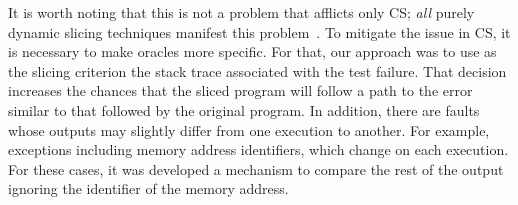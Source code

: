 \documentclass{article}
\begin{document}
It is worth noting that this is not a problem that afflicts only CS;
\emph{all} purely dynamic slicing techniques manifest this
problem~\cite{Lin:2018:BDE:3238147.3238163}. To mitigate the issue in
CS, it is necessary to make oracles more specific. For that, our
approach was to use as the slicing criterion the stack trace
associated with the test failure. That decision increases the chances
that the sliced program will follow a path to the error similar to
that followed by the original program.
In addition, there are faults whose outputs
may slightly differ from one execution to another. For example,
exceptions including memory address identifiers, which change on
each execution. For these cases, it was developed a mechanism to compare the
rest of the output ignoring the identifier of the memory address.


\end{document}
